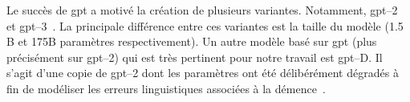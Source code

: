 Le succès de \gls{gpt} a motivé la création de plusieurs variantes.
Notamment, \gls{gpt}--2~\cite{Radford_Wu_Child_Luan_Amodei_Sutskever_2019} 
et \gls{gpt}--3~\cite{Brown_Mann_Ryder_Subbiah_Kaplan_Dhariwal_Neelakantan_Shyam_Sastry_Askell_etal._2020}.
La principale différence entre ces variantes est la taille du modèle (1.5 B et 175B paramètres respectivement).
Un autre modèle basé sur \gls{gpt} (plus précisément sur \gls{gpt}--2) 
qui est très pertinent pour notre travail est \gls{gpt}--D.
Il s'agit d'une copie de \gls{gpt}--2 dont les paramètres ont été délibérément dégradés
à fin de modéliser les erreurs linguistiques associées à la démence~\cite{Li_Knopman_Xu_Cohen_Pakhomov_2022}.